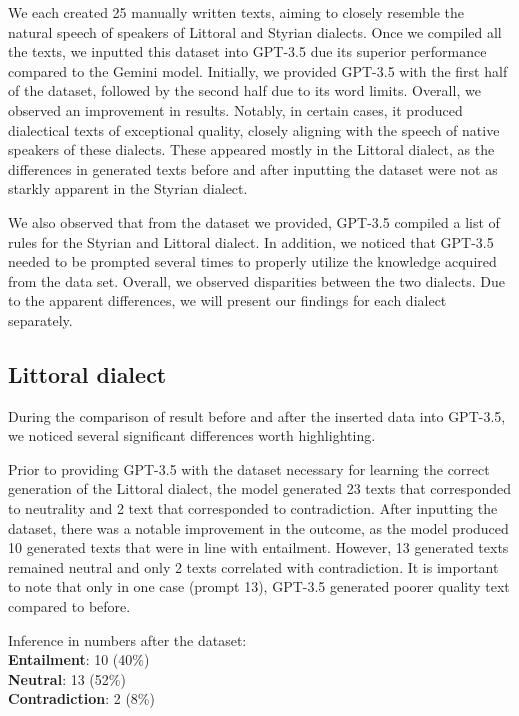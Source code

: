 \documentclass[fleqn,moreauthors,10pt]{ds_report}
\begin{document}
We each created 25 manually written texts, aiming to closely resemble the natural speech of speakers of  Littoral and Styrian dialects. Once we compiled all the texts, we inputted this dataset into GPT-3.5 due its superior performance compared to the Gemini model. Initially, we provided GPT-3.5 with the first half of the dataset, followed by the second half due to its word limits. Overall, we observed an improvement in results. Notably, in certain cases, it produced dialectical texts of exceptional quality, closely aligning with the speech of native speakers of these dialects. These appeared mostly in the Littoral dialect, as the differences in generated texts before and after inputting the dataset were not as starkly apparent in the Styrian dialect.

We also observed that from the dataset we provided, GPT-3.5 compiled a list of rules for the Styrian and Littoral dialect. In addition, we noticed that GPT-3.5 needed to be prompted several times to properly utilize the knowledge acquired from the data set. Overall,  we observed disparities between the two dialects. Due to the apparent differences, we will present our findings for each dialect separately.

\vspace{\baselineskip}
\subsection{Littoral dialect}

During the comparison of result before and after the inserted data into GPT-3.5, we noticed several significant differences worth highlighting. 

Prior to providing GPT-3.5 with the dataset necessary for learning the correct generation of the Littoral dialect, the model generated 23 texts that corresponded to neutrality  and 2 text that corresponded to contradiction. After inputting the dataset, there was a notable improvement in the outcome, as the model produced 10 generated texts that were in line with entailment. However, 13 generated texts remained neutral and only 2 texts correlated with contradiction. It is important to note that only in one case (prompt 13), GPT-3.5 generated poorer quality text compared to before. 

    \vspace{\baselineskip}
Inference in numbers after the dataset:
\n\\ \textbf{Entailment}: 10 (40\%)
\textbf{\n\\Neutral}: 13 (52\%)
\textbf{\n\\Contradiction}: 2 (8\%)
\end{document}
